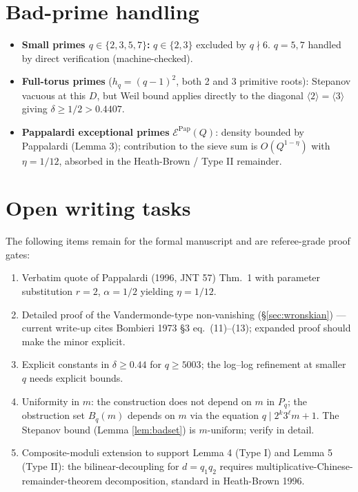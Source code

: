 \documentclass[12pt]{amsart}
\theoremstyle{definition}
\theoremstyle{remark}
\begin{document}
\section{Bad-prime handling}

\begin{itemize}
\item \textbf{Small primes $q \in \{2, 3, 5, 7\}$:} $q \in \{2, 3\}$ excluded
  by $q \nmid 6$. $q = 5, 7$ handled by direct verification (machine-checked).
\item \textbf{Full-torus primes} ($h_q = (q-1)^2$, both 2 and 3 primitive
  roots): Stepanov vacuous at this $D$, but Weil bound applies directly to
  the diagonal $\langle 2\rangle = \langle 3 \rangle$ giving $\delta \ge 1/2 > 0.4407$.
\item \textbf{Pappalardi exceptional primes} $\mathcal{E}^{\mathrm{Pap}}(Q)$:
  density bounded by Pappalardi (Lemma 3); contribution to the sieve sum
  is $O(Q^{1-\eta})$ with $\eta = 1/12$, absorbed in the
  Heath-Brown / Type II remainder.
\end{itemize}

\section{Open writing tasks}

The following items remain for the formal manuscript and are referee-grade
proof gates:

\begin{enumerate}
\item Verbatim quote of Pappalardi (1996, JNT 57) Thm.\ 1 with
  parameter substitution $r = 2$, $\alpha = 1/2$ yielding $\eta = 1/12$.
\item Detailed proof of the Vandermonde-type non-vanishing
  (\S\ref{sec:wronskian}) --- current write-up cites Bombieri 1973
  \S3 eq.\ (11)--(13); expanded proof should make the minor explicit.
\item Explicit constants in $\delta \ge 0.44$ for $q \ge 5003$; the
  log--log refinement at smaller $q$ needs explicit bounds.
\item Uniformity in $m$: the construction does not depend on $m$ in $P_q$;
  the obstruction set $B_q(m)$ depends on $m$ via the equation
  $q \mid 2^k 3^\ell m + 1$. The Stepanov bound (Lemma \ref{lem:badset}) is
  $m$-uniform; verify in detail.
\item Composite-moduli extension to support Lemma 4 (Type I) and
  Lemma 5 (Type II): the bilinear-decoupling for $d = q_1 q_2$ requires
  multiplicative-Chinese-remainder-theorem decomposition, standard in
  Heath-Brown 1996.
\end{enumerate}
\end{document}
